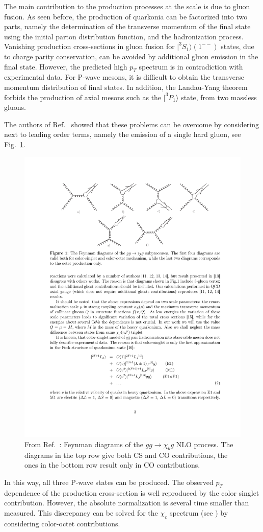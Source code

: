 The main contribution to the production processes at the \tev scale is due to
gluon fusion. As seen before, the production of quarkonia can be factorized
into two parts, namely the determination of the transverse momentum of the
final state using the initial parton distribution function, and the
hadronization process. Vanishing production cross-sections in gluon fusion for
$|^3 S_1\rangle (1^{--})$ states, due to charge parity conservation, can be avoided
by additional gluon emission in the final state. However, the predicted high
$p_T$ spectrum is in contradiction with experimental data. For P-wave mesons,
it is difficult to obtain the transverse momentum distribution of final states.
In addition, the Landau-Yang theorem forbids the production of axial mesons
such as the $|^3P_1\rangle$ state, from two massless gluons.

The authors of Ref.~\cite{Likhoded:2012hw} showed that these problems can be overcome
by considering next to leading order terms, namely the emission of a single
hard gluon, see Fig.~\ref{fig:chibprod_fig1}.
\begin{figure}
\center
\includegraphics[width=.75\textwidth]{figs/review/chibprod_fig1}
\caption{From Ref.~\cite{Likhoded:2012hw}: Feynman diagrams of the $gg\rightarrow \chi_b g$ NLO 
process. The diagrams in the top row give both CS and CO contributions, the ones in the 
bottom row result only in CO contributions.}
\label{fig:chibprod_fig1} 
\end{figure} 
In this way, all three P-wave states can be produced. 
The observed $p_T$ dependence of the production cross-section is well reproduced by 
the color singlet contribution. However, the absolute normalization is several time smaller 
than measured. This discrepancy can be solved for the $\chi_c$ spectrum (see )
by considering color-octet contributions.

